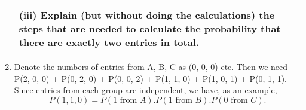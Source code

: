 \documentclass[a4paper,12pt]{article}
\begin{document}
\begin{enumerate}

\begin{table}[ht!]
     
\centering
     
\begin{tabular}{|p{15cm}|}
     
\hline        

\noindent

(iii) Explain (but without doing the calculations) the steps that are needed to calculate the probability that there are exactly two entries in total.

\\ \hline
      
\end{tabular}
    
\end{table}


\item  Denote the numbers of entries from A, B, C as (0, 0, 0) etc. Then we need P(2, 0, 0) + P(0, 2, 0) + P(0, 0, 2) + P(1, 1, 0) + P(1, 0, 1) + P(0, 1, 1). Since entries from each group are independent, we have, as an example, 
\[P(1, 1, 0) = P(1 \mbox{ from }A).P(1 \mbox{ from } B).P(0 \mbox{ from } C).\]
\end{enumerate}
\end{document}
